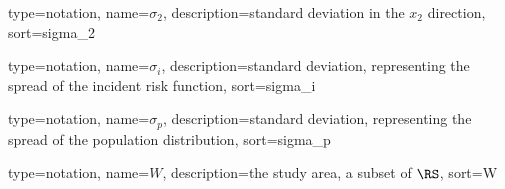 {%
   type=notation,
   name={\ensuremath{\sigma_2}},
   description={standard deviation in the \ensuremath{x_2} direction},
   sort={sigma_2}
}

{%
   type=notation,
   name={\ensuremath{\sigma_i}},
   description={standard deviation, representing the spread of the incident risk function},
   sort={sigma_i}
}

{%
   type=notation,
   name={\ensuremath{\sigma_p}},
   description={standard deviation, representing the spread of the population distribution},
   sort={sigma_p}
}

{%
   type=notation,
   name={\ensuremath{W}},
   description={the study area, a subset of \ensuremath{\RS}},
   sort={W}
}

